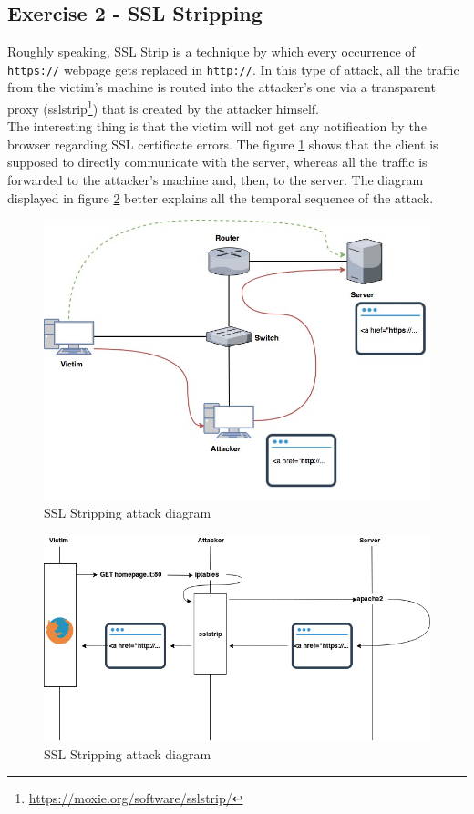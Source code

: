 \documentclass[final]{article}
\begin{document}
\subsection{Exercise 2 - SSL Stripping}
Roughly speaking, SSL Strip is a technique by which every occurrence of \texttt{https://} webpage gets replaced in \texttt{http://}.
In this type of attack, all the traffic from the victim’s machine is routed into the attacker's one via a transparent proxy
(sslstrip\footnote{\url{https://moxie.org/software/sslstrip/}}) that is created by the attacker himself.\\
The interesting thing is that the victim will not get any notification by the browser regarding SSL certificate errors.
The figure \ref{sslstrip} shows that the client is supposed to directly communicate with the server,
whereas all the traffic is forwarded to the attacker's machine and, then, to the server.
The diagram displayed in figure \ref{sslstrip_time} better explains all the temporal sequence of the attack.\\
\begin{figure}[h]
  \center
  \includegraphics[width=\textwidth]{../figures/sslstrip}
  \caption{SSL Stripping attack diagram}
  \label{sslstrip}
\end{figure}
\begin{figure}[h]
  \center
  \includegraphics[width=\textwidth]{../figures/sslstrip_time}
  \caption{SSL Stripping attack diagram}
  \label{sslstrip_time}
\end{figure}
\end{document}
